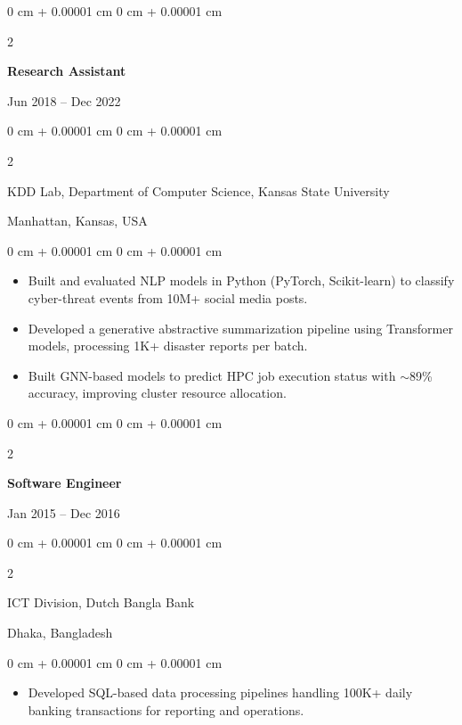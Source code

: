 \documentclass[10pt, letterpaper]{article}
\newenvironment{highlights}{
    \begin{itemize}[
        topsep=0.10 cm,
        parsep=0.10 cm,
        partopsep=0pt,
        itemsep=0pt,
        leftmargin=0 cm + 10pt
    ]
}{
    \end{itemize}
} %
\newenvironment{onecolentry}{
    \begin{adjustwidth}{
        0 cm + 0.00001 cm
    }{
        0 cm + 0.00001 cm
    }
}{
    \end{adjustwidth}
} %
\newenvironment{twocolentry}[2][]{
    \onecolentry
    \def\secondColumn{#2}
    \setcolumnwidth{\fill, 4.5 cm}
    \begin{paracol}{2}
}{
    \switchcolumn \raggedleft \secondColumn
    \end{paracol}
    \endonecolentry
} %
\begin{document}
    \vspace{2mm}
    
    \begin{twocolentry}{Jun 2018 -- Dec 2022}
        \textbf{Research Assistant}
    \end{twocolentry}
    \begin{twocolentry}{Manhattan, Kansas, USA}
       KDD Lab, Department of Computer Science, Kansas State University
    \end{twocolentry}
    \vspace{0.10 cm}
    \begin{onecolentry}
        \begin{highlights}
            \item Built and evaluated NLP models in Python (PyTorch, Scikit-learn) to classify cyber-threat events from 10M+ social media posts.
            \item Developed a generative abstractive summarization pipeline using Transformer models, processing 1K+ disaster reports per batch.
            \item Built GNN-based models to predict HPC job execution status with $\sim$89\% accuracy, improving cluster resource allocation.
        \end{highlights}
    \end{onecolentry}

    \vspace{2mm}
    \begin{twocolentry}{Jan 2015 -- Dec 2016}
        \textbf{Software Engineer}
    \end{twocolentry}
    \begin{twocolentry}{Dhaka, Bangladesh}
       ICT Division, Dutch Bangla Bank
    \end{twocolentry}
    
    \begin{onecolentry}
        \begin{highlights}
            \item Developed SQL-based data processing pipelines handling 100K+ daily banking transactions for reporting and operations.
        \end{highlights}
    \end{onecolentry}
    
\end{document}
